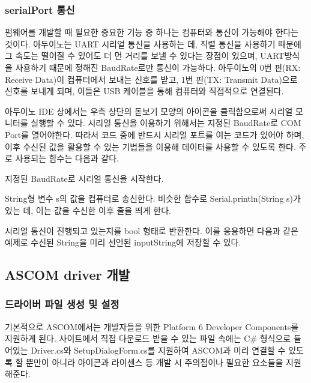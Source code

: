 \subsubsection{serialPort 통신}
펌웨어를 개발할 때 필요한 중요한 기능 중 하나는 컴퓨터와 통신이 가능해야 한다는 것이다. 아두이노는 UART 시리얼 통신을 사용하는 데, 직렬 통신을 사용하기 때문에 그 속도는 떨어질 수 있어도 더 먼 거리를 보낼 수 있다는 장점이 있으며, UART방식을 사용하기 때문에 정해진 BaudRate로만 통신이 가능하다. 아두이노의 0번 핀(RX: Receive Data)이 컴퓨터에서 보내는 신호를 받고, 1번 핀(TX: Transmit Data)으로 신호를 보내게 되며, 이들은 USB 케이블을 통해 컴퓨터와 직접적으로 연결된다.

아두이노 IDE 상에서는 우측 상단의 돋보기 모양의 아이콘을 클릭함으로써 시리얼 모니터를 실행할 수 있다. 시리얼 통신을 이용하기 위해서는 지정된 BaudRate로 COM Port를 열어야한다. 따라서 코드 중에 반드시 시리얼 포트를 여는 코드가 있어야 하며, 이후 수신된 값을 활용할 수 있는 기법들을 이용해 데이터를 사용할 수 있도록 한다. 주로 사용되는 함수는 다음과 같다.

\begin{description}[font=$\bullet$~\normalfont\scshape\color{red!50!black}]
	\item [Serial.begin(int BaudRate)] 지정된 BaudRate로 시리얼 통신을 시작한다.
	\item [Serial.print(String s)] String형 변수 s의 값을 컴퓨터로 송신한다. 비슷한 함수로 Serial.println(String s)가 있는 데, 이는 값을 수신한 이후 줄을 띄게 한다.
	\item [Serial.available()] 시리얼 통신이 진행되고 있는지를 bool 형태로 반환한다. 이를 응용하면 다음과 같은 예제로 수신된 String을 미리 선언된 inputString에 저장할 수 있다.
\end{description}


\subsection{ASCOM driver 개발}



\subsubsection{드라이버 파일 생성 및 설정}
기본적으로 ASCOM에서는 개발자들을 위한 Platform 6 Developer Components를 지원하게 된다. 사이트에서 직접 다운로드 받을 수 있는 파일 속에는 C\# 형식으로 들어있는 Driver.cs와 SetupDialogForm.cs를 지원하여 ASCOM과 미리 연결할 수 있도록 할 뿐만이 아니라 아이콘과 라이센스 등 개발 시 주의점이나 필요한 요소들을 지원해준다.

